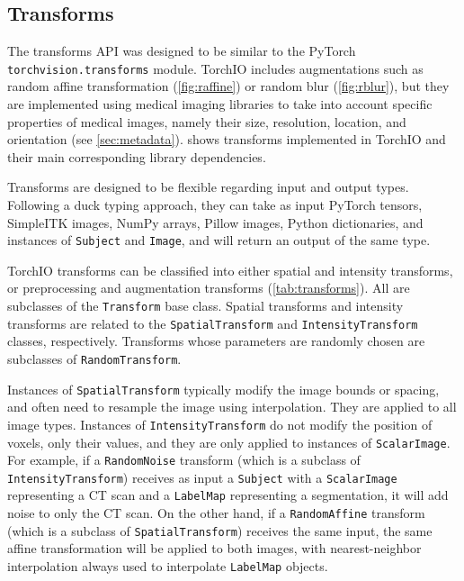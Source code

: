 \subsection{Transforms}
\label{sec:transforms}

The transforms \ac{API} was designed to be similar to the PyTorch \texttt{torchvision.transforms} module.
TorchIO includes augmentations such as random affine transformation (\cref{fig:raffine}) or random blur (\cref{fig:rblur}), but they are implemented using medical imaging libraries \cite{lowekamp_design_2013,brett_nipynibabel_2020} to take into account specific properties of medical images, namely their size, resolution, location, and orientation (see \cref{sec:metadata}).
 shows transforms implemented in TorchIO \torchioversion and their main corresponding library dependencies.





Transforms are designed to be flexible regarding input and output types.
Following a duck typing approach, they can take as input PyTorch tensors, SimpleITK images, NumPy arrays, Pillow images, Python dictionaries, and instances of \texttt{Subject} and \texttt{Image}, and will return an output of the same type.

TorchIO transforms can be classified into either spatial and intensity transforms, or preprocessing and augmentation transforms (\cref{tab:transforms}).
All are subclasses of the \texttt{Transform} base class.
Spatial transforms and intensity transforms are related to the \texttt{SpatialTransform} and \texttt{IntensityTransform} classes, respectively.
Transforms whose parameters are randomly chosen are subclasses of \texttt{RandomTransform}.

Instances of \texttt{SpatialTransform} typically modify the image bounds or spacing, and often need to resample the image using interpolation.
They are applied to all image types.
Instances of \texttt{IntensityTransform} do not modify the position of voxels, only their values, and they are only applied to instances of \texttt{ScalarImage}.
For example, if a \texttt{RandomNoise} transform (which is a subclass of \texttt{IntensityTransform}) receives as input a \texttt{Subject} with a \texttt{ScalarImage} representing a \ac{CT} scan and a \texttt{LabelMap} representing a segmentation, it will add noise to only the \ac{CT} scan.
On the other hand, if a \texttt{RandomAffine} transform (which is a subclass of \texttt{SpatialTransform}) receives the same input, the same affine transformation will be applied to both images, with nearest-neighbor interpolation always used to interpolate \texttt{LabelMap} objects.


